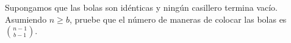 \begin{statement}{5}
  Supongamos que las bolas son id\'enticas y ning\'un casillero termina vac\'io.
  Asumiendo $n \geq b$, pruebe que el n\'umero de maneras de colocar las bolas es $\binom{n - 1}{b - 1}$.
\end{statement}